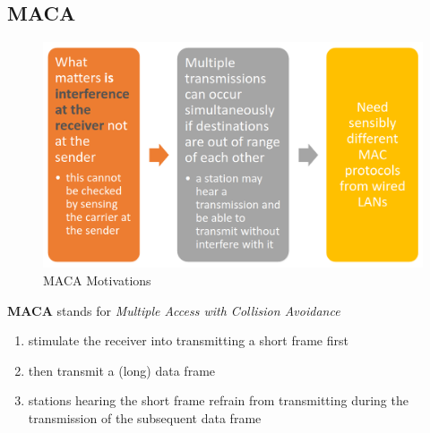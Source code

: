 \subsection{MACA}
\begin{figure}[htbp]
   \centering
   \includegraphics{images/MACA_motivations.png}
   \caption{MACA Motivations}
   \label{fig:MACA_motivations}
\end{figure}

\textbf{MACA} stands for \textit{Multiple Access with Collision Avoidance}
\begin{enumerate}
   \item stimulate the receiver into transmitting a short
   frame first
   \item then transmit a (long) data frame
   \item stations hearing the short frame refrain from
   transmitting during the transmission of the
   subsequent data frame
\end{enumerate}